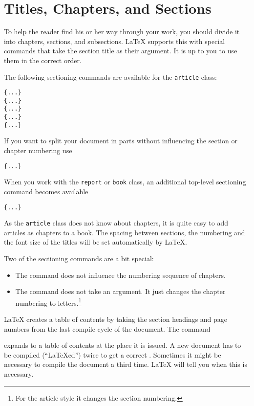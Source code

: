 \section{Titles, Chapters, and Sections}

To help the reader find his or her way through your work, you should
divide it into chapters, sections, and subsections.  \LaTeX{} supports
this with special commands that take the section title as their
argument.  It is up to you to use them in the correct order.

The following sectioning commands are available for the
\texttt{article} class: \nopagebreak

\begin{lscommand}
\verb|{...}|\\
\verb|{...}|\\
\verb|{...}|\\
\verb|{...}|\\
\verb|{...}|
\end{lscommand}

If you want to split your document in parts without influencing the
section or chapter numbering use
\begin{lscommand}
\verb|{...}|
\end{lscommand}

When you work with the \texttt{report} or \texttt{book} class,
an additional top-level sectioning command becomes available
\begin{lscommand}
\verb|{...}|
\end{lscommand}

As the \texttt{article} class does not know about chapters, it is quite easy
to add articles as chapters to a book.
The spacing between sections, the numbering and the font size of the
titles will be set automatically by \LaTeX. 

Two of the sectioning commands are a bit special: 
\begin{itemize}
\item The  command does
  not influence the numbering sequence of chapters.  
\item The  command does not take an argument. It just
  changes the chapter numbering to letters.\footnote{For the article
    style it changes the section numbering.}
\end{itemize}



\LaTeX{} creates a table of contents by taking the section headings
and page numbers from the last compile cycle of the document. The command 
\begin{lscommand} 
\end{lscommand} 
\noindent expands to a table of contents at the place it
is issued. A new
document has to be compiled (``\LaTeX ed'') twice to get a
correct . Sometimes it might be
necessary to compile the document a third time. \LaTeX{} will tell you
when this is necessary.


